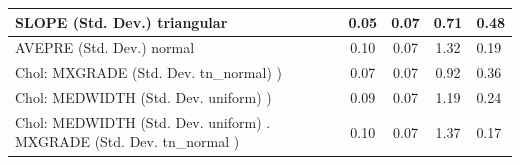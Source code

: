 \begin{table}
\begin{center}
\begin{tabular}{|l|l|c|c|c|l|}
			\hline
			SLOPE (Std. Dev.) triangular &  & 0.05 & 0.07 & 0.71 & 0.48 \\
			\hline
			AVEPRE (Std. Dev.) normal &  & 0.10 & 0.07 & 1.32 & 0.19 \\
			\hline
			 Chol: MXGRADE (Std. Dev. tn_normal) ) &  & 0.07 & 0.07 & 0.92 & 0.36 \\
			\hline
			 Chol: MEDWIDTH (Std. Dev. uniform) ) &  & 0.09 & 0.07 & 1.19 & 0.24 \\
			\hline
			 Chol: MEDWIDTH (Std. Dev. uniform) . MXGRADE (Std. Dev.   tn_normal ) &  & 0.10 & 0.07 & 1.37 & 0.17 \\
			\hline
		\end{tabular}
	\end{center}
\end{table}